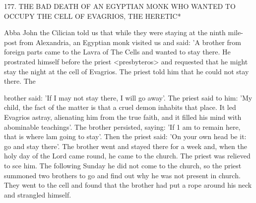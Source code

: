 177.
THE BAD DEATH OF AN EGYPTIAN MONK
WHO WANTED TO OCCUPY THE CELL
OF EVAGRIOS, THE HERETIC*

Abba John the Cilician told us that while they were staying at the
ninth mile-post from Alexandria, an Egyptian monk visited us and
said: 'A brother from foreign parts came to the Lavra of The Cells
and wanted to stay there.
He prostrated himself before the priest
<presbyteros> and requested that he might stay the night at the cell
of Evagrios.
The priest told him that he could not stay there.
The

brother said: 'If I may not stay there, I will go away'.
The priest
said to him: 'My child, the fact of the matter is that a cruel demon
inhabits that place.
It led Evagrios astray, alienating him from the
true faith, and it filled his mind with abominable teachings'.
The
brother persisted, saying: 'If 1 am to remain here, that is where lam
going to stay'.
Then the priest said: 'On your own head be it: go
and stay there'.
The brother went and stayed there for a week and,
when the holy day of the Lord came round, he came to the church.
The priest was relieved to sce him.
The following Sunday he did not
come to the church, so the priest summoned two brothers to go and
find out why he was not present in church.
They went to the cell
and found that the brother had put a rope around his neck and
strangled himself.

